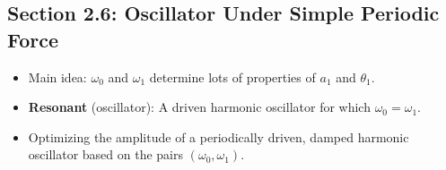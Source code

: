 \documentclass[../notes.tex]{subfiles}
\begin{document}
\subsection*{Section 2.6: Oscillator Under Simple Periodic Force}
\begin{itemize}
    \item Main idea: $\omega_0$ and $\omega_1$ determine lots of properties of $a_1$ and $\theta_1$.
    \item \textbf{Resonant} (oscillator): A driven harmonic oscillator for which $\omega_0=\omega_1$.
    \item Optimizing the amplitude of a periodically driven, damped harmonic oscillator based on the pairs $(\omega_0,\omega_1)$.
    \begin{figure}[h!]
        \centering
        \begin{subfigure}[b]{0.24\linewidth}
            \centering
\end{subfigure}
\end{figure}
\end{itemize}
\end{document}
